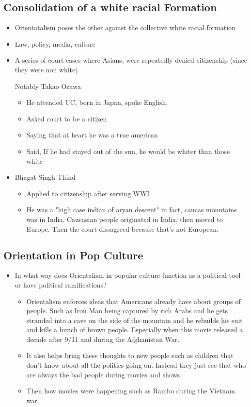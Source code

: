 \documentclass{article}
\begin{document}
\subsection{Consolidation of a white racial Formation}
\begin{itemize}
  \item Orientatalism poses the other against the collective
    white racial formation
  \item Law, policy, media, culture
  \item A series of court cases where Asians,
    were repeatedly denied citizenship (since they were non white)

    Notably Takao Ozawa
    \begin{itemize}
      \item He attended UC, born in Japan, spoke English.
      \item Asked court to be a citizen
      \item Saying that at heart he was a true american
      \item Said, If he had stayed out of the sun, he would be whiter than those white
    \end{itemize}
  \item Bhagat Singh Thind
    \begin{itemize}
      \item Applied to citizenship after serving WWI
      \item He was a "high case indian of aryan descent"
        in fact, caucas mountains was in India. Caucasian people
        originated in India, then moved to Europe.
        Then the court dissagreed because that's not 
        European.
    \end{itemize}
\end{itemize}

\subsection{Orientation in Pop Culture}
\begin{itemize}
  \item In what way does Orientalism in popular culture function as
    a political tool or have political ramifications?
    \begin{itemize}
      \item Orientalism enforces ideas that Americans
        already have about groups of people.
        Such as Iron Man being captured by
        rich Arabs and he gets stranded into a cave on the
        side of the mountain and he rebuilds his suit and
        kills a bunch of brown people. Especially when this movie released
        a decade after 9/11 and during the Afghanistan War.
      \item It also helps bring these thoughts to new people such 
        as children that don't know about all the politics going
        on. Instead they just see that who are always the bad people
        during movies and shows.
      \item Then how movies were happening such as Rambo during the Vietnam war.
    \end{itemize}
\end{itemize}
\end{document}
